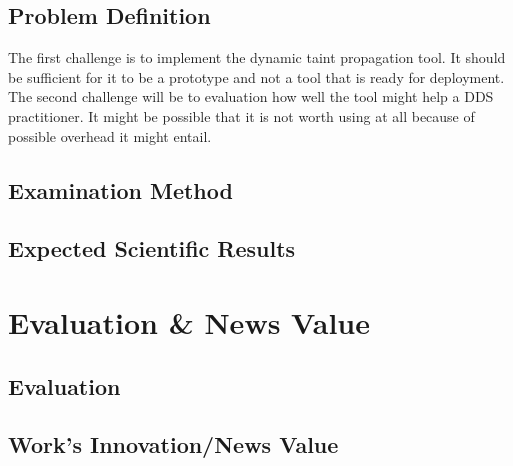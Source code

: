 \documentclass{../kththesis}
\begin{document}
\section{Problem Definition}
The first challenge is to implement the dynamic taint propagation tool. It should be sufficient for it to be a prototype and not a tool that is ready for deployment. The second challenge will be to evaluation how well the tool might help a DDS practitioner. It might be possible that it is not worth using at all because of possible overhead it might entail.


\section{Examination Method}


\section{Expected Scientific Results}


\chapter{Evaluation \& News Value}
\section{Evaluation}


\section{Work's Innovation/News Value}
\end{document}
